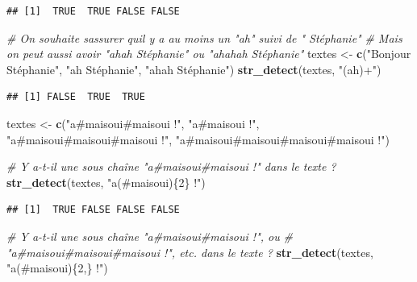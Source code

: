 \documentclass[
  11pt,
]{book}
\newenvironment{Shaded}{\begin{snugshade}}{\end{snugshade}}
\newcommand{\CommentTok}[1]{\textcolor[rgb]{0.56,0.35,0.01}{\textit{#1}}}
\newcommand{\KeywordTok}[1]{\textcolor[rgb]{0.13,0.29,0.53}{\textbf{#1}}}
\newcommand{\NormalTok}[1]{#1}
\newcommand{\StringTok}[1]{\textcolor[rgb]{0.31,0.60,0.02}{#1}}
\numberwithin{equation}{section}
\numberwithin{countremarque}{section}
\begin{document}
\begin{lstlisting}
## [1]  TRUE  TRUE FALSE FALSE
\end{lstlisting}

\begin{Shaded}
\begin{Highlighting}[]
\CommentTok{\# On souhaite s\textquotesingle{}assurer qu\textquotesingle{}il y a au moins un "ah" suivi de " Stéphanie"}
\CommentTok{\# Mais on peut aussi avoir "ahah Stéphanie" ou "ahahah Stéphanie"}
\NormalTok{textes \textless{}{-}}\StringTok{ }\KeywordTok{c}\NormalTok{(}\StringTok{"Bonjour Stéphanie"}\NormalTok{, }\StringTok{"ah Stéphanie"}\NormalTok{, }\StringTok{"ahah Stéphanie"}\NormalTok{)}
\KeywordTok{str\_detect}\NormalTok{(textes, }\StringTok{"(ah)+"}\NormalTok{)}
\end{Highlighting}
\end{Shaded}

\begin{lstlisting}
## [1] FALSE  TRUE  TRUE
\end{lstlisting}

\begin{Shaded}
\begin{Highlighting}[]
\NormalTok{textes \textless{}{-}}\StringTok{ }\KeywordTok{c}\NormalTok{(}\StringTok{"a\#maisoui\#maisoui !"}\NormalTok{, }\StringTok{"a\#maisoui !"}\NormalTok{, }\StringTok{"a\#maisoui\#maisoui\#maisoui !"}\NormalTok{,}
           \StringTok{"a\#maisoui\#maisoui\#maisoui\#maisoui !"}\NormalTok{)}

\CommentTok{\# Y a{-}t{-}il une sous chaîne "a\#maisoui\#maisoui !" dans le texte ?}
\KeywordTok{str\_detect}\NormalTok{(textes, }\StringTok{"a(\#maisoui)\{2\} !"}\NormalTok{)}
\end{Highlighting}
\end{Shaded}

\begin{lstlisting}
## [1]  TRUE FALSE FALSE FALSE
\end{lstlisting}

\begin{Shaded}
\begin{Highlighting}[]
\CommentTok{\# Y a{-}t{-}il une sous chaîne "a\#maisoui\#maisoui !", ou}
\CommentTok{\# "a\#maisoui\#maisoui\#maisoui !", etc. dans le texte ?}
\KeywordTok{str\_detect}\NormalTok{(textes, }\StringTok{"a(\#maisoui)\{2,\} !"}\NormalTok{)}
\end{Highlighting}
\end{Shaded}
\end{document}

